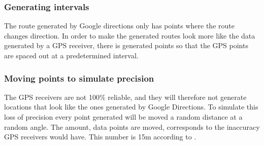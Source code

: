 \subsubsection{Generating intervals}
The route generated by Google directions only has points where the route changes direction.
In order to make the generated routes look more like the data generated by a GPS receiver, there is generated points so that the GPS points are spaced out at a predetermined interval.

\subsubsection{Moving points to simulate precision}
The GPS receivers are not 100\% reliable, and they will therefore not generate locations that look like the ones generated by Google Directions.
To simulate this loss of precision every point generated will be moved a random distance at a random angle.
The amount, data points are moved, corresponds to the inaccuracy GPS receivers would have. This number is 15m according to \citet{garmingps}.
